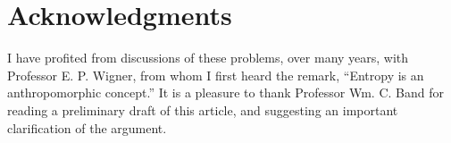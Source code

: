 \documentclass[twocolumn]{article}
\begin{document}
\section{Acknowledgments}\label{sec-acknowledgments}

I have profited from discussions of these problems, over many years,
with Professor E. P. Wigner, from whom I first heard the remark,
``Entropy is an anthropomorphic concept.'' It is a pleasure to thank
Professor Wm. C. Band for reading a preliminary draft of this article,
and suggesting an important clarification of the argument.
\end{document}
